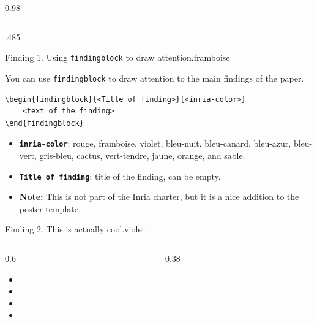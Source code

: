 \documentclass[final,svgnames,english]{beamer}
\begin{document}
\begin{frame}[fragile]{}
\begin{columns}[T]
\begin{column}{0.98\linewidth}
\begin{columns}[T]
        \begin{column}{.485\linewidth}
          \begin{plainblock}{}
            \begin{findingblock}{Finding 1. Using \texttt{findingblock} to draw attention.}{framboise}

              You can use \texttt{findingblock} to draw attention to the main findings of the paper.
                \begin{verbatim}
\begin{findingblock}{<Title of finding>}{<inria-color>}
    <text of the finding>
\end{findingblock}
                \end{verbatim}
              \begin{itemize}
                \item \textbf{\texttt{inria-color}}: rouge, framboise, violet, bleu-nuit, bleu-canard, bleu-azur, bleu-vert, gris-bleu, cactus, vert-tendre, jaune, orange, and sable.
                \item \textbf{\texttt{Title of finding}}: title of the finding, can be empty.
                \item \textbf{Note:} This is not part of the Inria charter, but it is a nice addition to the poster template.
              \end{itemize}
            \end{findingblock}

            \begin{findingblock}{Finding 2. This is actually cool.}{violet}
              \begin{columns}[T]
                \begin{column}{0.6\textwidth}
                  \begin{itemize}
                    \item \lipsum[1][1]
                    \item \lipsum[1][2]
                    \item \lipsum[1][3]
                    \item \lipsum[1][4]
                  \end{itemize}
                \end{column}
                \begin{column}{0.38\textwidth}
                  
                \end{column}
              \end{columns}
            \end{findingblock}


\end{plainblock}
\end{column}
\end{columns}
\end{column}
\end{columns}
\end{frame}
\end{document}
